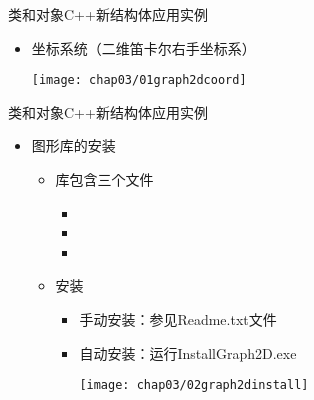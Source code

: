 \begin{frame}[fragile]{类和对象}{C++新结构体应用实例}%
  \begin{itemize}
  \item {}坐标系统（二维笛卡尔右手坐标系）\\[2ex]
      \begin{center}
        \texttt{[image: chap03/01graph2dcoord]}
      \end{center}
  \end{itemize}
\end{frame}

\begin{frame}[fragile]{类和对象}{C++新结构体应用实例}%
  \begin{spacing}{1.2}
  \begin{itemize}  
  \item 图形库的安装
    \begin{itemize}
    \item {}库包含三个文件
      \begin{itemize}
      \item {}
      \item {}
      \item {} 
      \end{itemize}
    \item 安装
      \begin{itemize}
      \item 手动安装：参见Readme.txt文件
      \item 自动安装：运行InstallGraph2D.exe
        \begin{center}
          \vspace{1ex}
          \texttt{[image: chap03/02graph2dinstall]}
        \end{center}
      \end{itemize}
    \end{itemize}
  \end{itemize}
  \end{spacing}
\end{frame}

